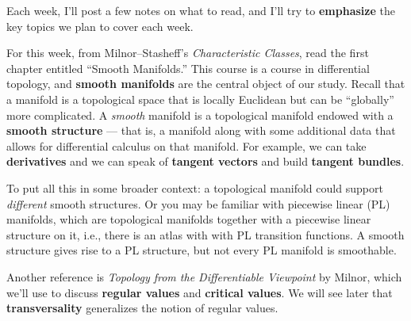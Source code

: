 \documentclass{homework}
\author{Jim Fowler}
\date{Week 1: Manifolds}
\begin{document}
\maketitle

Each week, I'll post a few notes on what to read, and I'll try to
\textbf{emphasize} the key topics we plan to cover each week.

For this week, from Milnor--Stasheff's \textit{Characteristic
  Classes}, read the first chapter entitled ``Smooth Manifolds.''
This course is a course in differential topology, and \textbf{smooth
  manifolds} are the central object of our study.  Recall that a
manifold is a topological space that is locally Euclidean but can be
``globally'' more complicated.  A \textit{smooth} manifold is a
topological manifold endowed with a \textbf{smooth structure} --- that
is, a manifold along with some additional data that allows for
differential calculus on that manifold.  For example, we can take
\textbf{derivatives} and we can speak of \textbf{tangent vectors} and
build \textbf{tangent bundles}.

To put all this in some broader context: a topological manifold could
support \textit{different} smooth structures.  Or you may be familiar
with piecewise linear (PL) manifolds, which are topological manifolds
together with a piecewise linear structure on it, i.e., there is an
atlas with with PL transition functions.  A smooth structure gives
rise to a PL structure, but not every PL manifold is smoothable.

Another reference is \textit{Topology from the Differentiable
  Viewpoint} by Milnor, which we'll use to discuss \textbf{regular
  values} and \textbf{critical values}.  We will see later that
\textbf{transversality} generalizes the notion of regular values.
\end{document}

